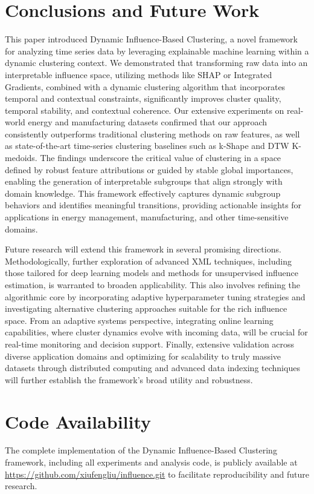 \documentclass[final,authoryear,3p,times,review,sort&compress]{elsarticle}
\begin{document}
\section{Conclusions and Future Work}
\label{sec:con}
This paper introduced Dynamic Influence-Based Clustering, a novel framework for analyzing time series data by leveraging explainable machine learning within a dynamic clustering context. We demonstrated that transforming raw data into an interpretable influence space, utilizing methods like SHAP or Integrated Gradients, combined with a dynamic clustering algorithm that incorporates temporal and contextual constraints, significantly improves cluster quality, temporal stability, and contextual coherence. Our extensive experiments on real-world energy and manufacturing datasets confirmed that our approach consistently outperforms traditional clustering methods on raw features, as well as state-of-the-art time-series clustering baselines such as k-Shape and DTW K-medoids. The findings underscore the critical value of clustering in a space defined by robust feature attributions or guided by stable global importances, enabling the generation of interpretable subgroups that align strongly with domain knowledge. This framework effectively captures dynamic subgroup behaviors and identifies meaningful transitions, providing actionable insights for applications in energy management, manufacturing, and other time-sensitive domains.

Future research will extend this framework in several promising directions. Methodologically, further exploration of advanced XML techniques, including those tailored for deep learning models and methods for unsupervised influence estimation, is warranted to broaden applicability. This also involves refining the algorithmic core by incorporating adaptive hyperparameter tuning strategies and investigating alternative clustering approaches suitable for the rich influence space. From an adaptive systems perspective, integrating online learning capabilities, where cluster dynamics evolve with incoming data, will be crucial for real-time monitoring and decision support. Finally, extensive validation across diverse application domains and optimizing for scalability to truly massive datasets through distributed computing and advanced data indexing techniques will further establish the framework's broad utility and robustness.

\section*{Code Availability}
\label{sec:code_availability}
The complete implementation of the Dynamic Influence-Based Clustering framework, including all experiments and analysis code, is publicly available at \url{https://github.com/xiufengliu/influence.git} to facilitate reproducibility and future research.



\end{document}
